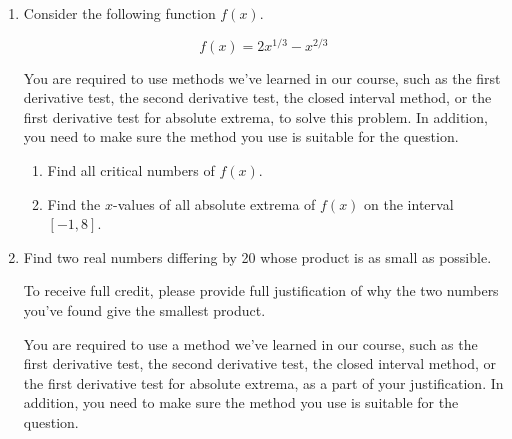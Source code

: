 \documentclass[11pt]{article}
\begin{document}
\begin{enumerate}

\item Consider the following function $f(x)$.%

\[f(x)=2x^{1/3}-x^{2/3}\]%


You are required to use methods we've learned in our course, such as the first derivative test, the second derivative test, the closed interval method, or the first derivative test for absolute extrema, to solve this problem. In addition, you need to make sure the method you use is suitable for the question.

\begin{enumerate}
    \item Find all critical numbers of $f(x)$.

    \vfill



    \item Find the $x$-values of all absolute extrema of $f(x)$ on the interval $[-1, 8]$.


    \vfill
\end{enumerate}


\newpage


\item Find two real numbers differing by 20 whose product is as small as possible.

To receive full credit, please provide full justification of why the two numbers you've found give the smallest product. 

You are required to use a method we've learned in our course, such as the first derivative test, the second derivative test, the closed interval method, or the first derivative test for absolute extrema, as a part of your justification. In addition, you need to make sure the method you use is suitable for the question.


\end{enumerate}
\end{document}
